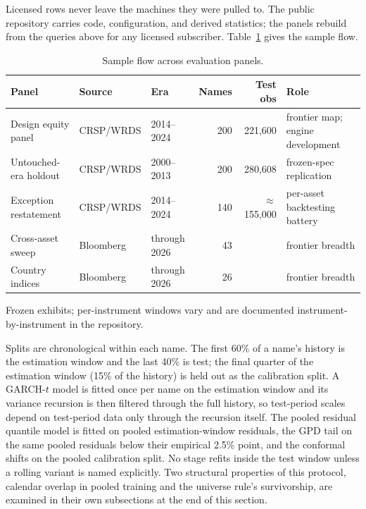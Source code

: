 \documentclass[11pt]{article}
\theoremstyle{remark}
\begin{document}
Licensed rows never leave the machines they were pulled to. The public
repository carries code, configuration, and derived statistics; the
panels rebuild from the queries above for any licensed subscriber.
Table~\ref{tab:sampleflow} gives the sample flow.

\begin{table}[t]
\centering\small
\begin{threeparttable}
\caption{Sample flow across evaluation panels.}
\label{tab:sampleflow}
\footnotesize\setlength{\tabcolsep}{4pt}
\begin{tabular}{lllrrl}
\toprule
Panel & Source & Era & Names & Test obs & Role \\
\midrule
Design equity panel & CRSP/WRDS & 2014--2024 & 200 & 221{,}600 & frontier map; engine development \\
Untouched-era holdout & CRSP/WRDS & 2000--2013 & 200 & 280{,}608 & frozen-spec replication \\
Exception restatement & CRSP/WRDS & 2014--2024 & 140 & $\approx$155{,}000 & per-asset backtesting battery \\
Cross-asset sweep & Bloomberg & through 2026 & 43 & \tnote{a} & frontier breadth \\
Country indices & Bloomberg & through 2026 & 26 & \tnote{a} & frontier breadth \\
\bottomrule
\end{tabular}
\begin{tablenotes}\footnotesize
\item[a] Frozen exhibits; per-instrument windows vary and are
documented instrument-by-instrument in the repository.
\end{tablenotes}
\end{threeparttable}
\end{table}

Splits are chronological within each name. The first 60\% of a name's
history is the estimation window and the last 40\% is test; the final
quarter of the estimation window (15\% of the history) is held out as
the calibration split. A GARCH-$t$ model is fitted once per name on
the estimation window and its variance recursion is then filtered
through the full history, so test-period scales depend on test-period
data only through the recursion itself. The pooled residual quantile
model is fitted on pooled estimation-window residuals, the GPD tail on
the same pooled residuals below their empirical 2.5\% point, and the
conformal shifts on the pooled calibration split. No stage refits
inside the test window unless a rolling variant is named explicitly.
Two structural properties of this protocol, calendar overlap in
pooled training and the universe rule's survivorship, are examined in
their own subsections at the end of this section.
\end{document}
